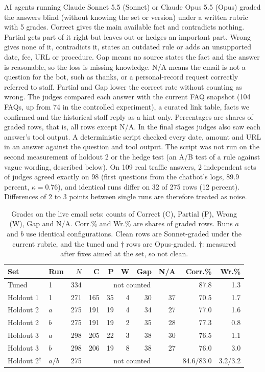 \documentclass[a4paper,10pt,twocolumn]{article}
\begin{document}
AI agents running Claude Sonnet 5.5 (Sonnet) or Claude Opus 5.5 (Opus) graded the answers blind (without knowing the set or version) under a written rubric with 5 grades. Correct gives the main available fact and contradicts nothing. Partial gets part of it right but leaves out or hedges an important part. Wrong gives none of it, contradicts it, states an outdated rule or adds an unsupported date, fee, URL or procedure. Gap means no source states the fact and the answer is reasonable, so the loss is missing knowledge. N/A means the email is not a question for the bot, such as thanks, or a personal-record request correctly referred to staff. Partial and Gap lower the correct rate without counting as wrong. The judges compared each answer with the current FAQ snapshot (104 FAQs, up from 74 in the controlled experiment), a curated link table, facts we confirmed and the historical staff reply as a hint only. Percentages are shares of graded rows, that is, all rows except N/A. In the final stages judges also saw each answer's tool output. A deterministic script checked every date, amount and URL in an answer against the question and tool output. The script was not run on the second measurement of holdout 2 or the hedge test (an A/B test of a rule against vague wording, described below). On 109 real traffic answers, 2 independent sets of judges agreed exactly on 98 (first questions from the chatbot's logs, 89.9 percent, $\kappa=0.76$), and identical runs differ on 32 of 275 rows (12 percent). Differences of 2 to 3 points between single runs are therefore treated as noise.

\begin{table}[t]
\centering\footnotesize
\setlength{\tabcolsep}{2.1pt}
\caption{Grades on the live email sets: counts of Correct (C), Partial (P), Wrong (W), Gap and N/A. Corr.\% and Wr.\% are shares of graded rows. Runs $a$ and $b$ use identical configurations. Clean rows are Sonnet-graded under the current rubric, and the tuned and $\dagger$ rows are Opus-graded. $\dagger$: measured after fixes aimed at the set, so not clean.}\label{tab:live}
\begin{tabular}{@{}llrrrrrrrr@{}}
\toprule
Set & Run & $N$ & C & P & W & Gap & N/A & Corr.\% & Wr.\%\\
\midrule
Tuned & 1 & 334 & \multicolumn{5}{c}{not counted} & 87.8 & 1.3\\
Holdout 1 & 1 & 271 & 165 & 35 & 4 & 30 & 37 & 70.5 & 1.7\\
Holdout 2 & $a$ & 275 & 191 & 19 & 4 & 34 & 27 & 77.0 & 1.6\\
Holdout 2 & $b$ & 275 & 191 & 19 & 2 & 35 & 28 & 77.3 & 0.8\\
Holdout 3 & $a$ & 298 & 205 & 22 & 3 & 38 & 30 & 76.5 & 1.1\\
Holdout 3 & $b$ & 298 & 206 & 19 & 8 & 38 & 27 & 76.0 & 3.0\\
\midrule
Holdout 2$^\dagger$ & $a$/$b$ & 275 & \multicolumn{5}{c}{not counted} & 84.6/83.0 & 3.2/3.2\\
\bottomrule
\end{tabular}
\end{table}
\end{document}
